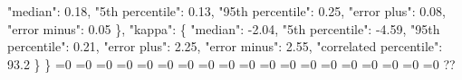 {{        "median": 0.18, %
        "5th percentile": 0.13, %
        "95th percentile": 0.25, %
        "error plus": 0.08, %
        "error minus": 0.05%
      \}, %
      "kappa": \{%
        "median": {-}2.04, %
        "5th percentile": {-}4.59, %
        "95th percentile": 0.21, %
        "error plus": 2.25, %
        "error minus": 2.55, %
        "correlated percentile": 93.2%
      \}%
    \}}%
  \else%
    \ifnum{}=0%
      \let\qchieffCopulaCorrelationModel@I@out\qchieffCopulaCorrelationModel@III%
    \else%
      \ifnum{}=0%
      \let\qchieffCopulaCorrelationModel@I@out\qchieffCopulaCorrelationModel@IV%
    \else%
      \ifnum{}=0%
      \let\qchieffCopulaCorrelationModel@I@out\qchieffCopulaCorrelationModel@V%
    \else%
      \ifnum{}=0%
      \let\qchieffCopulaCorrelationModel@I@out\qchieffCopulaCorrelationModel@VI%
    \else%
      \ifnum{}=0%
      \let\qchieffCopulaCorrelationModel@I@out\qchieffCopulaCorrelationModel@VII%
    \else%
      \ifnum{}=0%
      \let\qchieffCopulaCorrelationModel@I@out\qchieffCopulaCorrelationModel@VIII%
    \else%
      \ifnum{}=0%
      \let\qchieffCopulaCorrelationModel@I@out\qchieffCopulaCorrelationModel@IX%
    \else%
      \ifnum{}=0%
      \let\qchieffCopulaCorrelationModel@I@out\qchieffCopulaCorrelationModel@X%
    \else%
      \ifnum{}=0%
      \let\qchieffCopulaCorrelationModel@I@out\qchieffCopulaCorrelationModel@XI%
    \else%
      \ifnum{}=0%
      \let\qchieffCopulaCorrelationModel@I@out\qchieffCopulaCorrelationModel@XII%
    \else%
      \ifnum{}=0%
      \let\qchieffCopulaCorrelationModel@I@out\qchieffCopulaCorrelationModel@XIII%
    \else%
      \ifnum{}=0%
      \let\qchieffCopulaCorrelationModel@I@out\qchieffCopulaCorrelationModel@XIV%
    \else%
      \ifnum{}=0%
      \let\qchieffCopulaCorrelationModel@I@out\qchieffCopulaCorrelationModel@XV%
    \else%
      \ifnum{}=0%
      \let\qchieffCopulaCorrelationModel@I@out\qchieffCopulaCorrelationModel@XVI%
    \else%
      \ifnum{}=0%
      \let\qchieffCopulaCorrelationModel@I@out\qchieffCopulaCorrelationModel@XVII%
    \else%
      \ifnum{}=0%
      \let\qchieffCopulaCorrelationModel@I@out\qchieffCopulaCorrelationModel@XVIII%
    \else%
      \ifnum{}=0%
      \let\qchieffCopulaCorrelationModel@I@out\qchieffCopulaCorrelationModel@XIX%
    \else%
      \ifnum{}=0%
      \let\qchieffCopulaCorrelationModel@I@out\qchieffCopulaCorrelationModel@XX%
    \else%
      \ifnum{}=0%
      \let\qchieffCopulaCorrelationModel@I@out\qchieffCopulaCorrelationModel@XXI%
    \else%
      \def\qchieffCopulaCorrelationModel@I@out{%
    ??}%
    \fi\fi\fi\fi\fi\fi\fi\fi\fi\fi\fi\fi\fi\fi\fi\fi\fi\fi\fi
  \fi
  \qchieffCopulaCorrelationModel@I@out
}\newcommand\qchieffCopulaCorrelationModel@II[1][all]{%
  \ifnum\pdfstrcmp{#1}{all}=0%
    \def\qchieffCopulaCorrelationModel@II@out{%
    \{\}}%
  \else%
    \def\qchieffCopulaCorrelationModel@II@out{%
    ??}%
    
}
